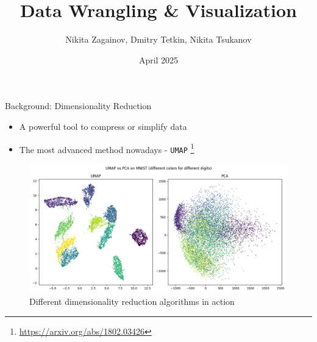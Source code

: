 \documentclass[aspectratio=169]{beamer}
\title{Data Wrangling \& Visualization}
\author{Nikita Zagainov, Dmitry Tetkin, Nikita Tsukanov}
\date{April 2025}
\begin{document}





\begin{frame}[plain]
\end{frame}





\begin{frame}{Background: Dimensionality Reduction}
	\begin{itemize}
		\item A powerful tool to compress or simplify data
		\item The most advanced method nowadays - \texttt{UMAP}
		      \footnote{\url{https://arxiv.org/abs/1802.03426}}
	\end{itemize}
	\begin{figure}
		\includegraphics[scale=.3]{fig/pca_vs_umap.png}
		\caption{Different dimensionality reduction algorithms in action}
	\end{figure}
\end{frame}
\end{document}
